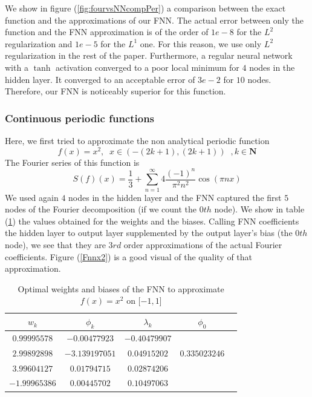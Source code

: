 \documentclass[AMS,STIX1COL]{WileyNJD-v2}
\begin{document}
We show in figure (\ref{fig:fourvsNNcompPer}) a comparison between the exact function and the approximations of our FNN. The actual error between only the function and the FNN approximation is of the order of $1e-8$ for the $L^2$ regularization and $1e-5$ for the $L^1$ one. For this reason, we use only $L^2$ regularization in the rest of the paper. Furthermore, a regular neural network with a $\tanh$ activation converged to a poor local minimum for $4$ nodes in the hidden layer. It converged to an acceptable error of $3e-2$ for $10$ nodes. Therefore, our FNN is noticeably superior for this function. 




\subsubsection{Continuous periodic functions}  
Here, we first tried to approximate the non analytical periodic function
$$
f(x) = x^2, \;\; \text{$x \in \left(-(2k+1), (2k+1)\right)$}\;\;, k \in \mathbf{N}
$$
The Fourier series of this function is
$$
S(f)(x)= \frac{1}{3} + \sum_{n=1}^{\infty} 4 \frac{(-1)^n}{\pi^2 n^2} \cos(\pi nx)
$$
We used again $4$ nodes in the hidden layer and the FNN captured the first $5$ nodes of the Fourier decomposition (if we count the $0th$ node). We show in table (\ref{tabfnnx2}) the values obtained for the weights and the biases. Calling FNN coefficients the hidden layer to output layer supplemented by the output layer's bias (the $0th$ node), we see that they are $3rd$ order approximations of the actual Fourier coefficients. Figure (\ref{Fnnx2}) is a good visual of the quality of that approximation.
\begin{table}[!h]
  \begin{center}
  \begin{tabular}{ |c|c|c|c|c| } 
\hline
$w_k$ & $\phi_k$ & $\lambda_k$& $\phi_0$ \\
\hline
$0.99995578$ & $-0.00477923$ &$-0.40479907$& \\ 
$2.99892898$&$-3.139197051$ & $0.04915202$& $0.335023246$ \\ 
$3.99604127$& $0.01794715$ & $0.02874206$& \\ 
$ -1.99965386$& $0.00445702$ & $ 0.10497063$& \\ 
\hline
\end{tabular}
\caption{Optimal weights and biases of the FNN to approximate $ f(x) = x^2$ on $[-1, 1$]}\label{tabfnnx2}
\end{center}
\end{table}
\end{document}
